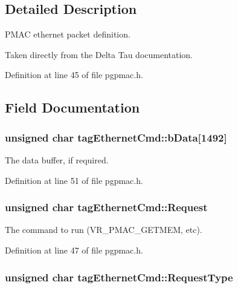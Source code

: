 \subsection{Detailed Description}
P\-M\-A\-C ethernet packet definition. 

Taken directly from the Delta Tau documentation. 

Definition at line 45 of file pgpmac.\-h.



\subsection{Field Documentation}
\hypertarget{structtagEthernetCmd_a872dab798127d6f589974a79c5d0aef1}{
\subsubsection[{b\-Data}]{\setlength{\rightskip}{0pt plus 5cm}unsigned char tag\-Ethernet\-Cmd\-::b\-Data\mbox{[}1492\mbox{]}}}\label{structtagEthernetCmd_a872dab798127d6f589974a79c5d0aef1}


The data buffer, if required. 



Definition at line 51 of file pgpmac.\-h.

\hypertarget{structtagEthernetCmd_a0dc566e7edbb226f1a4ea443d93d56e2}{
\subsubsection[{Request}]{\setlength{\rightskip}{0pt plus 5cm}unsigned char tag\-Ethernet\-Cmd\-::\-Request}}\label{structtagEthernetCmd_a0dc566e7edbb226f1a4ea443d93d56e2}


The command to run (V\-R\-\_\-\-P\-M\-A\-C\-\_\-\-G\-E\-T\-M\-E\-M, etc). 



Definition at line 47 of file pgpmac.\-h.

\hypertarget{structtagEthernetCmd_a6a155eb3ae546dd29369c4a33ddb3310}{
\subsubsection[{Request\-Type}]{\setlength{\rightskip}{0pt plus 5cm}unsigned char tag\-Ethernet\-Cmd\-::\-Request\-Type}}\label{structtagEthernetCmd_a6a155eb3ae546dd29369c4a33ddb3310}


